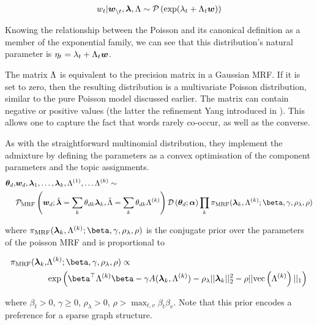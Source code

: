 \begin{align}
w_t | \bm w_{\setminus t}, \bm \lambda, \Lambda  \sim \mathcal{P} \left( {\exp(\lambda_t + \Lambda_t \bm w)} \right)
\end{align}

Knowing the relationship between the Poisson and its canonical definition as a member of the exponential family, we can see that this distribution's natural parameter is $\eta_t = \lambda_t + \Lambda_t \bm w$. 

The matrix $\Lambda$ is equivalent to the precision matrix in a Gaussian MRF. If it is set to zero, then the resulting distribution is a multivariate Poisson distribution, similar to the pure Poisson model discussed earlier. The matrix can contain negative or positive values (the latter the refinement Yang introduced in \cite{Yang2013a}). This allows one to capture the fact that words rarely co-occur, as well as the converse.

As with the straightforward multinomial distribution, they implement the admixture by defining the parameters as a convex optimisation of the component parameters and the topic assignments.
\begin{align} 
\begin{split}
\thd, &\wdoc, \vl_1, \ldots, \vl_k, \bl^{(1)}, \ldots \blk  \sim \\
& \mathcal{P}_{\text{MRF}}\left(\wdoc;  \hat{\vl} = \sum_k \thdk \vl_k, \hat{\bl} = \sum_k \thdk \blk \right)\dir{\thd; \vv{\alpha}}\prod_k \pi_{\text{MRF}}(\vl_k, \blk; \vv{\beta}, \gamma, \rho_\lambda, \rho)
\end{split}
\end{align}

where $\pi_{\text{MRF}}(\vl_k, \blk; \vv{\beta}, \gamma, \rho_\lambda, \rho)$ is the conjugate prior over the parameters of the poisson MRF and is proportional to

\begin{align}
\begin{split}
\pi_{\text{MRF}}(\vl_k, &\blk; \vv{\beta}, \gamma, \rho_\lambda, \rho) \propto \\
& \exp\left( \vv{\beta}\T\blk\vv{\beta} - \gamma A(\vl_k, \blk) - \rho_\lambda||\vl_k||_2^2 - \rho||\vecf{\blk}||_1 \right)
\end{split}
\end{align}

where $\beta_t > 0$, $\gamma \geq 0$, $\rho_\lambda > 0$, $\rho > \max_{t,v}\beta_t\beta_v$. Note that this prior encodes a preference for a sparse graph structure.


